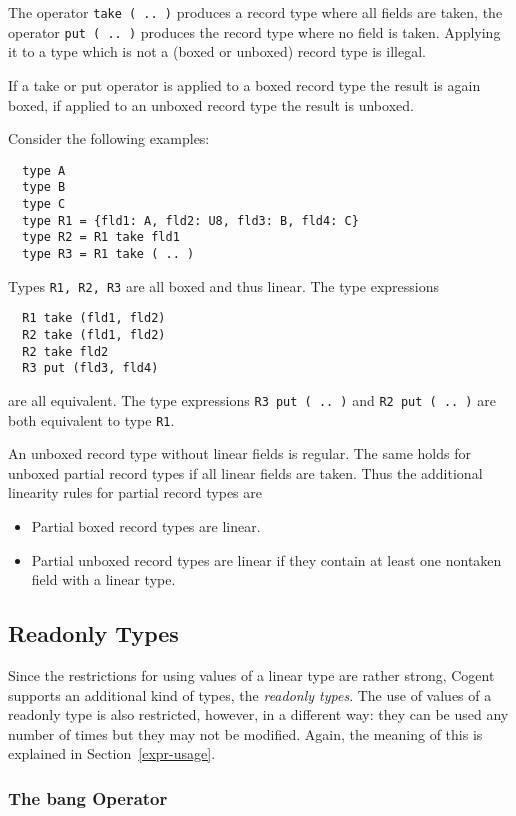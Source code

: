 \documentclass[a4paper]{report}
\newcommand{\code}[1]{\textnormal{\texttt{#1}}}
\newcommand{\cogent}{Cogent\xspace}
\begin{document}
The operator \code{take ( .. )} produces a record type where all fields are taken, the operator \code{put ( .. )} 
produces the record type where no field is taken. Applying it to a type which is not a (boxed or unboxed) record type
is illegal.

If a take or put operator is applied to a boxed record type the result is again boxed, if applied to an unboxed record type
the result is unboxed.

Consider the following examples:
\begin{verbatim}
  type A
  type B
  type C
  type R1 = {fld1: A, fld2: U8, fld3: B, fld4: C}
  type R2 = R1 take fld1
  type R3 = R1 take ( .. )
\end{verbatim}

Types \code{R1, R2, R3} are all boxed and thus linear. The type expressions 
\begin{verbatim}
  R1 take (fld1, fld2)
  R2 take (fld1, fld2)
  R2 take fld2
  R3 put (fld3, fld4)
\end{verbatim}
are all equivalent. The type expressions \code{R3 put ( .. )} and \code{R2 put ( .. )} are both equivalent to
type \code{R1}.

An unboxed record type without linear fields is regular. The same holds for unboxed partial record types if all
linear fields are taken. Thus the additional linearity rules for partial record types are
\begin{itemize}
\item Partial boxed record types are linear.
\item Partial unboxed record types are linear if they contain at least one nontaken field with a linear type.
\end{itemize}

\subsection{Readonly Types}

Since the restrictions for using values of a linear type are rather strong, \cogent supports an additional kind
of types, the \textit{readonly types}. The use of values of a readonly type is also restricted, however, in a
different way: they can be used any number of times but they may not be modified. Again,
the meaning of this is explained in Section~\ref{expr-usage}.

\subsubsection{The bang Operator}
\end{document}
